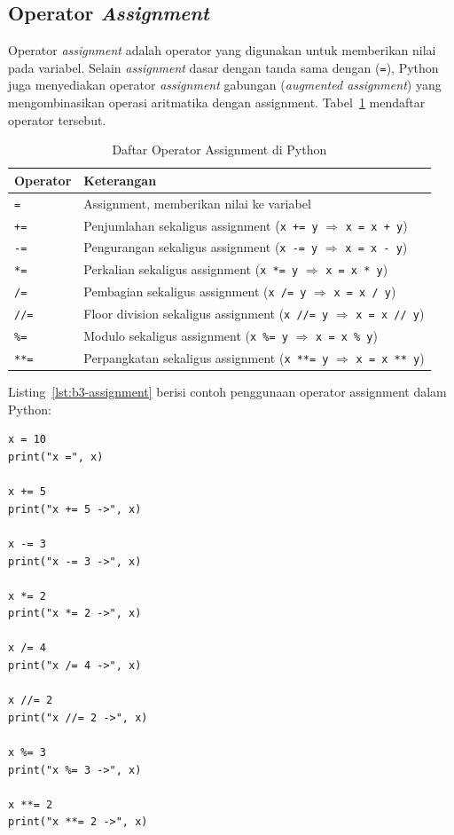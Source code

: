 \subsection{Operator \textit{Assignment}}
Operator \textit{assignment} adalah operator yang digunakan untuk memberikan nilai pada variabel. 
Selain \textit{assignment} dasar dengan tanda sama dengan (\texttt{=}), Python juga menyediakan operator 
\textit{assignment} gabungan (\textit{augmented assignment}) yang mengombinasikan operasi aritmatika dengan assignment. Tabel~\ref{tab:b3-assignment} mendaftar operator tersebut.

\begin{table}[H]
  \centering
  \caption{Daftar Operator Assignment di Python}
  \label{tab:b3-assignment}
  \begin{tabularx}{\textwidth}{lX}
    \hline
    \textbf{Operator} & \textbf{Keterangan} \\
    \hline
    \texttt{=} & Assignment, memberikan nilai ke variabel \\
    \hline
    \texttt{+=} & Penjumlahan sekaligus assignment (\texttt{x += y} $\Rightarrow$ \texttt{x = x + y}) \\
    \hline
    \texttt{-=} & Pengurangan sekaligus assignment (\texttt{x -= y} $\Rightarrow$ \texttt{x = x - y}) \\
    \hline
    \texttt{*=} & Perkalian sekaligus assignment (\texttt{x *= y} $\Rightarrow$ \texttt{x = x * y}) \\
    \hline
    \texttt{/=} & Pembagian sekaligus assignment (\texttt{x /= y} $\Rightarrow$ \texttt{x = x / y}) \\
    \hline
    \texttt{//=} & Floor division sekaligus assignment (\texttt{x //= y} $\Rightarrow$ \texttt{x = x // y}) \\
    \hline
    \texttt{\%=} & Modulo sekaligus assignment (\texttt{x \%= y} $\Rightarrow$ \texttt{x = x \% y}) \\
    \hline
    \texttt{**=} & Perpangkatan sekaligus assignment (\texttt{x **= y} $\Rightarrow$ \texttt{x = x ** y}) \\
    \hline
  \end{tabularx}
\end{table}

Listing~\ref{lst:b3-assignment} berisi contoh penggunaan operator assignment dalam Python:
\begin{lstlisting}[style=PythonStyle, caption={Kode Python: assignment_operator.py}, label={lst:b3-assignment}]
x = 10
print("x =", x)

x += 5
print("x += 5 ->", x)

x -= 3
print("x -= 3 ->", x)

x *= 2
print("x *= 2 ->", x)

x /= 4
print("x /= 4 ->", x)

x //= 2
print("x //= 2 ->", x)

x %= 3
print("x %= 3 ->", x)

x **= 2
print("x **= 2 ->", x)
\end{lstlisting}

